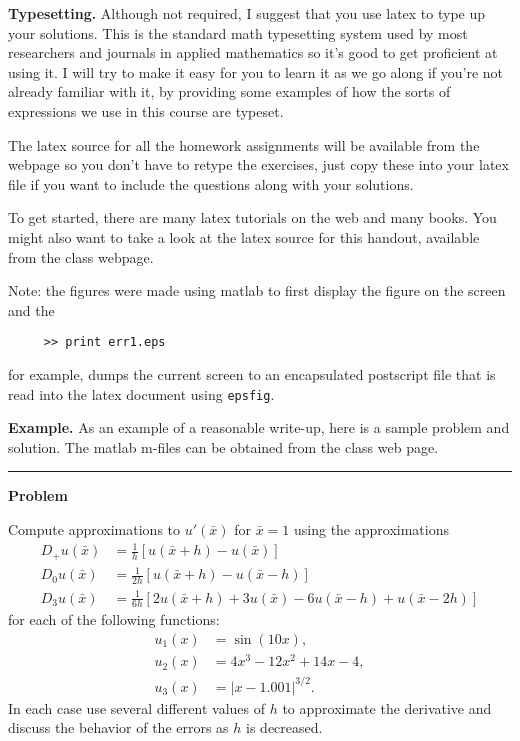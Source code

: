 \documentclass{article}
\newcommand{\bx}{\bar x}
\begin{document}
\vskip 10pt
{\bf Typesetting.}
Although not required, I suggest that you use latex to type up your
solutions.  This is the standard math typesetting system used by most
researchers and journals in applied mathematics so it's good to get
proficient at using it.  I will try to make it easy for you to learn it as
we go along if you're not already familiar with it, by providing some
examples of how the sorts of expressions we use in this course are typeset.

The latex source for all the homework assignments will be available
from the webpage so you don't have to retype the exercises, just copy these
into your latex file if you want to include the questions along with your
solutions.

To get started, there are many latex tutorials on the web and many books.  
You might also
want to take a look at the latex source for this handout, available from the
class webpage.

Note: the figures were made using matlab to first display the figure on the
screen and the
\begin{verbatim}
     >> print err1.eps
\end{verbatim}
for example, dumps the current screen to an encapsulated postscript file
that is read into the latex document using {\tt epsfig}.


\vskip 10pt
{\bf Example.} As an example of a reasonable write-up, here is a sample problem and
solution.  The matlab m-files can be obtained from the class web page.

\vskip 10pt
\hrule
\vskip 10pt

\centerline{\Large\bf Problem}
\vskip 10pt

Compute approximations to $u'(\bar x)$ for $\bar x=1$ using the
approximations 
\begin{equation*}
\begin{split} 
D_+u(\bar x) &= \frac{1}{h}[u(\bar x+h)-u(\bar x)]\\
D_0u(\bar x) &= \frac{1}{2h}[u(\bar x+h)-u(\bar x -h)]\\
D_3u(\bar x) &= \frac{1}{6h}[ 2u(\bx+h)+3u(\bx)-6u(\bx-h)+u(\bx-2h)]
\end{split}
\end{equation*} 
for each of the following functions:
\begin{equation*}
\begin{split}
u_1(x) &= \sin(10 x),\\
u_2(x) &= 4x^3-12x^2+14x-4,\\
u_3(x) &= |x-1.001|^{3/2}.
\end{split}
\end{equation*}
In each case use several different values of $h$ to approximate the
derivative
and discuss the behavior of the errors as $h$ is decreased.
\end{document}
